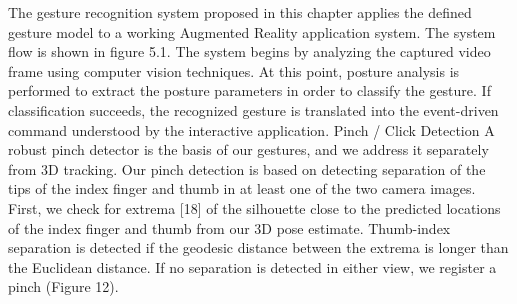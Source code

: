 The gesture recognition system proposed in this chapter applies the defined gesture model to a working Augmented Reality application system. The system flow is shown in figure 5.1. The system begins by analyzing the captured video frame using computer vision techniques. At this point, posture analysis is performed to extract the posture parameters in order to classify the gesture. If classification succeeds, the recognized gesture is translated into the event-driven command understood by the interactive application.
Pinch / Click Detection A robust pinch detector is the basis
of our gestures, and we address it separately from 3D tracking.
Our pinch detection is based on detecting separation of
the tips of the index finger and thumb in at least one of the
two camera images. First, we check for extrema [18] of the
silhouette close to the predicted locations of the index finger
and thumb from our 3D pose estimate. Thumb-index separation
is detected if the geodesic distance between the extrema
is longer than the Euclidean distance. If no separation is detected
in either view, we register a pinch (Figure 12).



